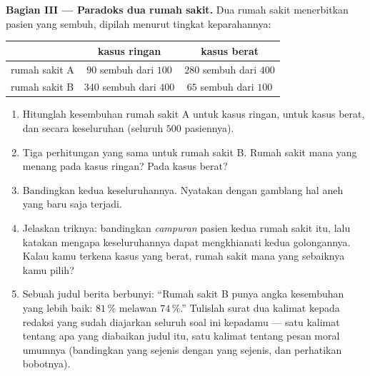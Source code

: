\begin{problem}
\medskip
\noindent\textbf{Bagian III --- Paradoks dua rumah sakit.}
Dua rumah sakit menerbitkan  pasien yang sembuh, dipilah
menurut tingkat keparahannya:
\begin{center}
\renewcommand{\arraystretch}{1.3}
\begin{tabular}{l|cc}
 & kasus ringan & kasus berat \\
\hline
rumah sakit A & $90$ sembuh dari $100$ & $280$ sembuh dari $400$ \\
rumah sakit B & $340$ sembuh dari $400$ & $65$ sembuh dari $100$ \\
\end{tabular}
\end{center}
\begin{enumerate}[resume]
  \item Hitunglah  kesembuhan rumah sakit A untuk
        kasus ringan, untuk kasus berat, dan secara keseluruhan
        (seluruh $500$ pasiennya).
  \item Tiga perhitungan yang sama untuk rumah sakit B. Rumah sakit
        mana yang menang pada kasus ringan? Pada kasus berat?
  \item Bandingkan kedua  keseluruhannya. Nyatakan
        dengan gamblang hal aneh yang baru saja terjadi.
  \item Jelaskan triknya: bandingkan \emph{campuran} pasien kedua
        rumah sakit itu, lalu katakan mengapa 
        keseluruhannya dapat mengkhianati kedua 
        golongannya. Kalau kamu terkena kasus yang berat, rumah sakit
        mana yang sebaiknya kamu pilih?
  \item Sebuah judul berita berbunyi: ``Rumah sakit B punya angka
        kesembuhan yang lebih baik: $81\,\%$ melawan $74\,\%$.''
        Tulislah surat dua kalimat kepada redaksi yang sudah diajarkan
        seluruh soal ini kepadamu --- satu kalimat tentang apa yang
        diabaikan judul itu, satu kalimat tentang pesan moral umumnya
        (bandingkan yang sejenis dengan yang sejenis, dan perhatikan
        bobotnya).

\end{enumerate}
\end{problem}
